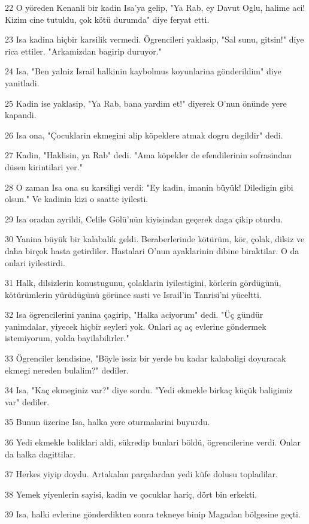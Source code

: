 \par 22 O yöreden Kenanli bir kadin Isa'ya gelip, "Ya Rab, ey Davut Oglu, halime aci! Kizim cine tutuldu, çok kötü durumda" diye feryat etti.
\par 23 Isa kadina hiçbir karsilik vermedi. Ögrencileri yaklasip, "Sal sunu, gitsin!" diye rica ettiler. "Arkamizdan bagirip duruyor."
\par 24 Isa, "Ben yalniz Israil halkinin kaybolmus koyunlarina gönderildim" diye yanitladi.
\par 25 Kadin ise yaklasip, "Ya Rab, bana yardim et!" diyerek O'nun önünde yere kapandi.
\par 26 Isa ona, "Çocuklarin ekmegini alip köpeklere atmak dogru degildir" dedi.
\par 27 Kadin, "Haklisin, ya Rab" dedi. "Ama köpekler de efendilerinin sofrasindan düsen kirintilari yer."
\par 28 O zaman Isa ona su karsiligi verdi: "Ey kadin, imanin büyük! Diledigin gibi olsun." Ve kadinin kizi o saatte iyilesti.
\par 29 Isa oradan ayrildi, Celile Gölü'nün kiyisindan geçerek daga çikip oturdu.
\par 30 Yanina büyük bir kalabalik geldi. Beraberlerinde kötürüm, kör, çolak, dilsiz ve daha birçok hasta getirdiler. Hastalari O'nun ayaklarinin dibine biraktilar. O da onlari iyilestirdi.
\par 31 Halk, dilsizlerin konustugunu, çolaklarin iyilestigini, körlerin gördügünü, kötürümlerin yürüdügünü görünce sasti ve Israil'in Tanrisi'ni yüceltti.
\par 32 Isa ögrencilerini yanina çagirip, "Halka aciyorum" dedi. "Üç gündür yanimdalar, yiyecek hiçbir seyleri yok. Onlari aç aç evlerine göndermek istemiyorum, yolda bayilabilirler."
\par 33 Ögrenciler kendisine, "Böyle issiz bir yerde bu kadar kalabaligi doyuracak ekmegi nereden bulalim?" dediler.
\par 34 Isa, "Kaç ekmeginiz var?" diye sordu. "Yedi ekmekle birkaç küçük baligimiz var" dediler.
\par 35 Bunun üzerine Isa, halka yere oturmalarini buyurdu.
\par 36 Yedi ekmekle baliklari aldi, sükredip bunlari böldü, ögrencilerine verdi. Onlar da halka dagittilar.
\par 37 Herkes yiyip doydu. Artakalan parçalardan yedi küfe dolusu topladilar.
\par 38 Yemek yiyenlerin sayisi, kadin ve çocuklar hariç, dört bin erkekti.
\par 39 Isa, halki evlerine gönderdikten sonra tekneye binip Magadan bölgesine geçti.

